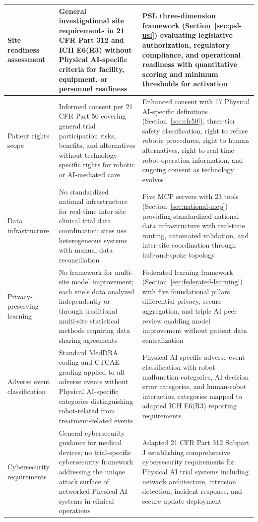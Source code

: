 \begin{longtable}{>{\raggedright\arraybackslash}p{3cm} >{\raggedright\arraybackslash}p{6cm} >{\raggedright\arraybackslash}p{7cm}}
\midrule
Site readiness assessment & General investigational site requirements in 21 CFR Part 312 and ICH E6(R3) without Physical AI-specific criteria for facility, equipment, or personnel readiness & PSL three-dimension framework (Section~\ref{sec:psl-usl}) evaluating legislative authorization, regulatory compliance, and operational readiness with quantitative scoring and minimum thresholds for activation \\
\midrule
Patient rights scope & Informed consent per 21 CFR Part 50 covering general trial participation risks, benefits, and alternatives without technology-specific rights for robotic or AI-mediated care & Enhanced consent with 17 Physical AI-specific definitions (Section~\ref{sec:cfr50}), three-tier safety classification, right to refuse robotic procedures, right to human alternatives, right to real-time robot operation information, and ongoing consent as technology evolves \\
\midrule
Data infrastructure & No standardized national infrastructure for real-time inter-site clinical trial data coordination; sites use heterogeneous systems with manual data reconciliation & Five MCP servers with 23 tools (Section~\ref{sec:national-mcp}) providing standardized national data infrastructure with real-time routing, automated validation, and inter-site coordination through hub-and-spoke topology \\
\midrule
Privacy-preserving learning & No framework for multi-site model improvement; each site's data analyzed independently or through traditional multi-site statistical methods requiring data sharing agreements & Federated learning framework (Section~\ref{sec:federated-learning}) with five foundational pillars, differential privacy, secure aggregation, and triple AI peer review enabling model improvement without patient data centralization \\
\midrule
Adverse event classification & Standard MedDRA coding and CTCAE grading applied to all adverse events without Physical AI-specific categories distinguishing robot-related from treatment-related events & Physical AI-specific adverse event classification with robot malfunction categories, AI decision error categories, and human-robot interaction categories mapped to adapted ICH E6(R3) \cite{ich-adapt} reporting requirements \\
\midrule
Cybersecurity requirements & General cybersecurity guidance for medical devices; no trial-specific cybersecurity framework addressing the unique attack surface of networked Physical AI systems in clinical operations & Adapted 21 CFR Part 312 \cite{cfr312-adapt} Subpart J establishing comprehensive cybersecurity requirements for Physical AI trial systems including network architecture, intrusion detection, incident response, and secure update deployment \\

\end{longtable}
